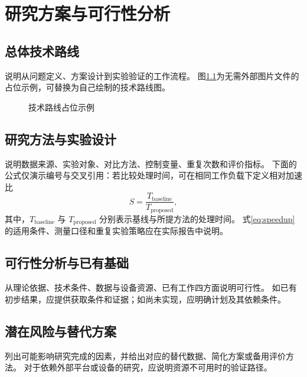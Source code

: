 \chapter{研究方案与可行性分析}

\section{总体技术路线}
说明从问题定义、方案设计到实验验证的工作流程。
图\ref{fig:route}为无需外部图片文件的占位示例，可替换为自己绘制的技术路线图。

\begin{figure}[htbp]
  \centering
  \caption{技术路线占位示例}
  \label{fig:route}
\end{figure}

\section{研究方法与实验设计}
说明数据来源、实验对象、对比方法、控制变量、重复次数和评价指标。
下面的公式仅演示编号与交叉引用：若比较处理时间，可在相同工作负载下定义相对加速比
\begin{equation}
  S = \frac{T_{\mathrm{baseline}}}{T_{\mathrm{proposed}}},
  \label{eq:speedup}
\end{equation}
其中，$T_{\mathrm{baseline}}$ 与 $T_{\mathrm{proposed}}$ 分别表示基线与所提方法的处理时间。
式\eqref{eq:speedup}的适用条件、测量口径和重复实验策略应在实际报告中说明。

\section{可行性分析与已有基础}
从理论依据、技术条件、数据与设备资源、已有工作四方面说明可行性。
如已有初步结果，应提供获取条件和证据；如尚未实现，应明确计划及其依赖条件。

\section{潜在风险与替代方案}
列出可能影响研究完成的因素，并给出对应的替代数据、简化方案或备用评价方法。
对于依赖外部平台或设备的研究，应说明资源不可用时的验证路径。
